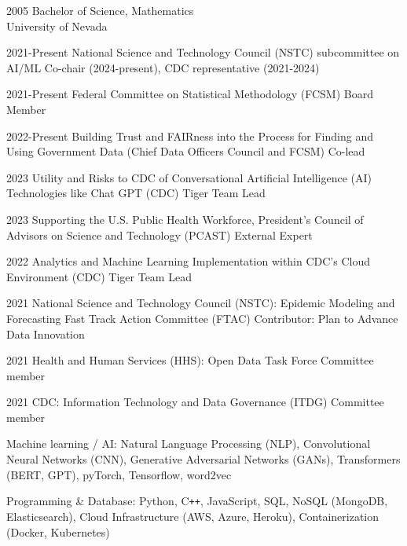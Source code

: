 \documentclass[]{scrartcl}
\begin{document}
\begin{cleanCV}
\WorkExperience
{2005}
{Bachelor of Science, Mathematics}
{\\University of Nevada}


\WorkExperienceX
{2021-Present}
{National Science and Technology Council (NSTC) subcommittee on AI/ML}
{Co-chair (2024-present), CDC representative (2021-2024)}

\WorkExperienceX
{2021-Present}
{Federal Committee on Statistical Methodology (FCSM)}
{Board Member}

\WorkExperienceX
{2022-Present}
{Building Trust and FAIRness into the Process for Finding and Using Government Data (Chief Data Officers Council and FCSM)}
{Co-lead}

\WorkExperienceX
{2023}
{Utility and Risks to CDC of Conversational Artificial Intelligence (AI) Technologies like Chat GPT (CDC)}
{Tiger Team Lead}

\WorkExperienceX
{2023}
{Supporting the U.S. Public Health Workforce, President's Council of Advisors on Science and Technology (PCAST)}
{External Expert}



\WorkExperienceX
{2022}
{Analytics and Machine Learning Implementation within CDC's Cloud Environment (CDC)}
{Tiger Team Lead}

\WorkExperienceX
{2021}
{National Science and Technology Council (NSTC): Epidemic Modeling and Forecasting Fast Track Action Committee (FTAC)}
{Contributor: Plan to Advance Data Innovation}

\WorkExperienceX
{2021}
{Health and Human Services (HHS): Open Data Task Force}
{Committee member}

\WorkExperienceX
{2021}
{CDC: Information Technology and Data Governance (ITDG)}
{Committee member}


\newpage


\WorkExperience
{ }
{Machine learning / AI: }
{Natural Language Processing (NLP), Convolutional Neural Networks (CNN), Generative Adversarial Networks (GANs), Transformers (BERT, GPT), pyTorch, Tensorflow, word2vec}

\WorkExperience
{ }
{Programming \& Database: }
{Python, C\texttt{++}, JavaScript, SQL, NoSQL (MongoDB, Elasticsearch), Cloud Infrastructure (AWS, Azure, Heroku), Containerization (Docker, Kubernetes)}


\end{cleanCV}
\end{document}
